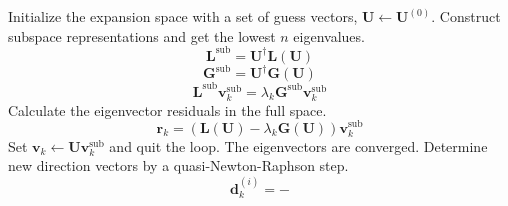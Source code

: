 \begin{algorithm}
    \caption{%
        Canonical multiroot Davidson algorithm for a generalized non-symmetric
        eigenvalue problem,
        $\mathbf{L}\mathbf{v}_k=\lambda_k\mathbf{G}\mathbf{v}_k$, with periodic
        subspace collapse.
        Requires linear transformation functions and diagonal approximations
        (indicated by tildes) for \(\mathbf{L}\) and \(\mathbf{G}\)
        and solves for the lowest \(n\) eigenvalues and eigenvectors.
    }
    \label{algo:davidson}
    \begin{algorithmic}[1]
        \State
        Initialize the expansion space with a set of guess vectors,
        \(\mathbf{U}\leftarrow\mathbf{U}^{(0)}\).
            \State
            Construct subspace representations and get the lowest \(n\)
            eigenvalues.
            \[
                \mathbf{L}^\mathrm{sub}
                =
                \mathbf{U}^\dagger
                \mathbf{L}(\mathbf{U})
            \]
            \[
                \mathbf{G}^\mathrm{sub}
                =
                \mathbf{U}^\dagger
                \mathbf{G}(\mathbf{U})
            \]
            \[
                \mathbf{L}^\mathrm{sub}
                \mathbf{v}_k^\mathrm{sub}
                =
                \lambda_k
                \mathbf{G}^\mathrm{sub}
                \mathbf{v}_k^\mathrm{sub}
            \]
            \State
            Calculate the eigenvector residuals in the full space.
            \[
                \mathbf{r}_k
                =
                (
                    \mathbf{L}(\mathbf{U})
                    -
                    \lambda_k
                    \mathbf{G}(\mathbf{U})
                )
                \mathbf{v}_k^\mathrm{sub}
            \]
                \State
                Set
                \(\mathbf{v}_k\leftarrow\mathbf{U}\mathbf{v}_k^\mathrm{sub}\)
                and quit the loop.  The eigenvectors are converged.
            \EndIf
            \State
            Determine new direction vectors by a quasi-Newton-Raphson step.
            \[
                \mathbf{d}_k^{(i)}
                =
                -
\]
\end{algorithmic}
\end{algorithm}
